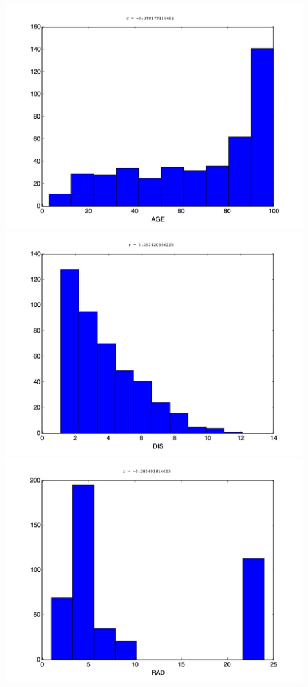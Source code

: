 \documentclass[]{report}
\begin{document}
\begin{center}
			\includegraphics[scale=0.2]{hist_6}\\
			\includegraphics[scale=0.2]{hist_7}\\
			\includegraphics[scale=0.2]{hist_8}\\

\end{center}
\end{document}
